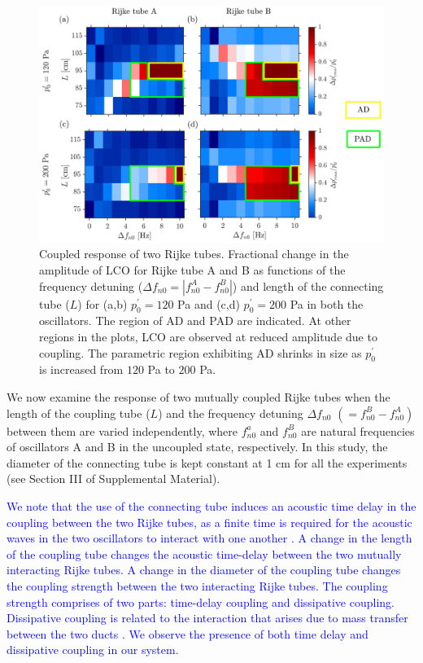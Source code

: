 \documentclass[%
preprint,
 amsmath,amssymb,
 aps,
 pra,
]{revtex4-2}
\begin{document}
\begin{figure}
\centering
\includegraphics[width=1\textwidth]{fig3.jpg}
\caption{\label{l_vs_detuning}Coupled response of two Rijke tubes. Fractional change in the amplitude of LCO for Rijke tube A and B as functions of the frequency detuning ($\Delta f_{n0}=|f_{n0}^A-f_{n0}^B|$) and length of the connecting tube ($L$) for (a,b) $p^\prime_{0}=120$ Pa and (c,d) $p^\prime_{0}=200$ Pa in both the oscillators. The region of AD and PAD are indicated. At other regions in the plots, LCO are observed at reduced amplitude due to coupling. The parametric region exhibiting AD shrinks in size as $p^\prime_{0}$ is increased from $120$ Pa to $200$ Pa.}
\end{figure}


We now examine the response of two mutually coupled Rijke tubes when the length of the coupling tube ($L$) and the frequency detuning $\Delta f_{n0}$ $(= f^B_{n0}-f^A_{n0})$ between them are varied independently, where $f^a_{n0}$ and $f^B_{n0}$ are natural frequencies of oscillators A and B in the uncoupled state, respectively. In this study, the diameter of the connecting tube is kept constant at 1 cm for all the experiments (see Section III of Supplemental Material). 

\textcolor{blue}{We note that the use of the connecting tube induces an acoustic time delay in the coupling between the two Rijke tubes, as a finite time is required for the acoustic waves in the two oscillators to interact with one another \cite{dange2019oscillation}. A change in the length of the coupling tube changes the acoustic time-delay between the two mutually interacting Rijke tubes. A change in the diameter of the coupling tube changes the coupling strength between the two interacting Rijke tubes. The coupling strength comprises of two parts: time-delay coupling and dissipative coupling. Dissipative coupling is related to the interaction that arises due to mass transfer between the two ducts \cite{bar1985stability}. We observe the presence of both time delay and dissipative coupling in our system.} 
\end{document}
